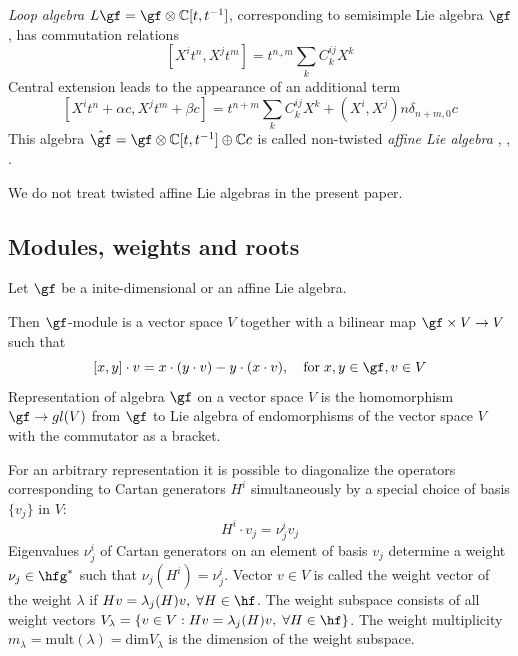 {\it Loop algebra} $L\gf=\gf\otimes \mathbb{C}[t,t^{-1}]$, corresponding to semisimple Lie algebra $\gf$, has commutation relations
\begin{equation}
  \label{eq:6}
  [X^{i}t^{n},X^{j}t^{m}]=t^{n_+m}\sum_{k}C^{ij}_{k}X^{k}
\end{equation}
Central extension leads to the appearance of an additional term
\begin{equation}
  \label{eq:7}
   [X^{i}t^{n}+\alpha c,X^{j}t^{m}+\beta c]=t^{n+m}\sum_{k}C^{ij}_{k}X^{k}+(X^{i},X^{j})n\delta_{n+m,0}c
\end{equation}
This algebra $\hat\gf=\gf\otimes\mathbb{C}[t,t^{-1}]\oplus\mathbb{C}c$ is called non-twisted {\it affine Lie algebra} \cite{kac1990idl}, \cite{wakimoto2001idl,wakimoto2001lectures}, \cite{kass1990ala}.

We do not treat twisted affine Lie algebras in the present paper.

\subsection{Modules, weights and roots}
\label{sec:weights-roots}

Let $\gf$ be a inite-dimensional or an affine Lie algebra.

Then $\gf$-module is a vector space $V$ together with a bilinear map $\gf \times V\to V$ such that
\begin{equation}
  \label{eq:2}
  [x,y]\cdot v = x\cdot(y\cdot v) - y\cdot(x\cdot v), \quad \mbox{for}\; x,y\in \gf, v\in V
\end{equation}
Representation of algebra $\gf$ on a vector space $V$ is the homomorphism $\gf\to gl(V)$ from $\gf$ to Lie algebra of endomorphisms of the  vector space $V$ with the commutator as a bracket.

For an arbitrary representation it is possible to diagonalize the operators corresponding to Cartan generators $H^{i}$ simultaneously by a special choice of basis $\{v_{j}\}$ in $V$:
\begin{equation}
  \label{eq:3}
  H^{i}\cdot v_{j}=\nu_{j}^{i}v_{j}
\end{equation}
Eigenvalues $\nu^{i}_{j}$ of Cartan generators on an element of basis $v_{j}$ determine a weight $\nu_{j}\in \hfg^{*}$ such that $\nu_{j}(H^{i})=\nu_{j}^{i}$. Vector $v\in V$ is called the weight vector of the weight $\lambda$ if $H v=\lambda_{j}(H)v,\; \forall H\in \hf$. The  weight subspace consists of all weight vectors $V_{\lambda}=\{v\in V: H v=\lambda_{j}(H)v,\; \forall H\in \hf\}$. The weight multiplicity $m_{\lambda}=\mathrm{mult}(\lambda)=\mathrm{dim} V_{\lambda}$ is the dimension of the weight subspace.

